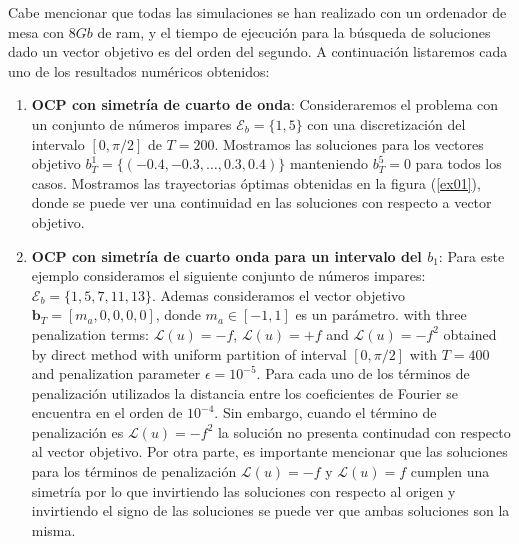 Cabe mencionar que todas las simulaciones se han realizado con un ordenador de mesa con $8Gb$ de ram, y el tiempo de ejecución para la búsqueda de soluciones dado un vector objetivo es del orden del segundo. A continuación listaremos cada uno de los resultados numéricos obtenidos:
\begin{enumerate}    


    \item \textbf{OCP con simetría de cuarto de onda}: Consideraremos el problema  con un conjunto de números impares $\mathcal{E}_b = \{1,5\}$ con una discretización del intervalo $[0,\pi/2]$ de $T = 200$. Mostramos las soluciones para los vectores objetivo $b_T^1 = \{(-0.4,-0.3,\dots,0.3,0.4)\}$ manteniendo $b_T^5=0$ para todos los casos. Mostramos las trayectorias óptimas obtenidas en la figura (\ref{ex01}), donde se puede ver una continuidad en las soluciones con respecto a vector objetivo.



    \item \textbf{OCP con simetría de cuarto onda para un intervalo del $b_1$}: Para este ejemplo consideramos el siguiente conjunto de números impares: $\mathcal{E}_b = \{1,5,7,11,13\}$. 
    Ademas consideramos el vector objetivo $\bm{b}_T = [m_a,0,0,0,0]$, donde  $m_a \in [-1,1]$ es un parámetro. with three penalization terms: $\mathcal{L}(u) = -f$, $\mathcal{L}(u) = +f$ and $\mathcal{L}(u) = -f^2$ obtained by direct method with uniform partition of interval $[0,\pi/2]$ with $T=400$ and penalization parameter $\epsilon = 10^{-5}$. 
    Para cada uno de los términos de penalización utilizados la distancia entre los coeficientes de Fourier se encuentra en el orden de $10^{-4}$. 
    Sin embargo, cuando el término de penalización es $\mathcal{L}(u)= -f^2$ la solución no presenta continudad con respecto al vector objetivo. 
    Por otra parte, es importante mencionar que las soluciones para los términos de penalización $\mathcal{L}(u) = -f$ y $\mathcal{L}(u) = f$ cumplen una simetría por lo que invirtiendo las soluciones con respecto al origen y invirtiendo el signo de las soluciones se puede ver que ambas soluciones son la misma.



\end{enumerate}
